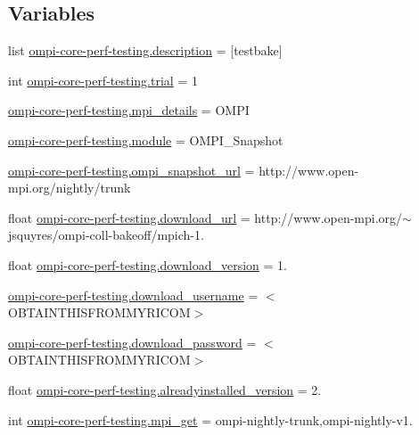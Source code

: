 \subsection*{Variables}
\begin{DoxyCompactItemize}
\item 
list \hyperlink{namespaceompi-core-perf-testing_a13c12ad10d2eefbe42582df0b6368e00}{ompi-\/core-\/perf-\/testing.\-description} = \mbox{[}testbake\mbox{]}
\item 
int \hyperlink{namespaceompi-core-perf-testing_a44334128c3f66cfb2779cf372d7021fa}{ompi-\/core-\/perf-\/testing.\-trial} = 1
\item 
\hyperlink{namespaceompi-core-perf-testing_a0afffa64305d9b33cce67b295a7b6162}{ompi-\/core-\/perf-\/testing.\-mpi\-\_\-details} = O\-M\-P\-I
\item 
\hyperlink{namespaceompi-core-perf-testing_a9cf3e97fe87ca3ae3174f504ca0003fd}{ompi-\/core-\/perf-\/testing.\-module} = O\-M\-P\-I\-\_\-\-Snapshot
\item 
\hyperlink{namespaceompi-core-perf-testing_aff15245731ec5f27b42a7377c4ea9555}{ompi-\/core-\/perf-\/testing.\-ompi\-\_\-snapshot\-\_\-url} = http\-://www.\-open-\/mpi.\-org/nightly/trunk
\item 
float \hyperlink{namespaceompi-core-perf-testing_a9a59a4bdb97826cfdd8302d83ef6fa02}{ompi-\/core-\/perf-\/testing.\-download\-\_\-url} = http\-://www.\-open-\/mpi.\-org/$\sim$jsquyres/ompi-\/coll-\/bakeoff/mpich-\/1.
\item 
float \hyperlink{namespaceompi-core-perf-testing_a74b2c9b82adde122ece307aaf00bff28}{ompi-\/core-\/perf-\/testing.\-download\-\_\-version} = 1.
\item 
\hyperlink{namespaceompi-core-perf-testing_a6e85e7b19cb6b339f8ed30ecbc658553}{ompi-\/core-\/perf-\/testing.\-download\-\_\-username} = $<$O\-B\-T\-A\-I\-N\-T\-H\-I\-S\-F\-R\-O\-M\-M\-Y\-R\-I\-C\-O\-M$>$
\item 
\hyperlink{namespaceompi-core-perf-testing_a5631c42bb25bbe102375dc4662d3b632}{ompi-\/core-\/perf-\/testing.\-download\-\_\-password} = $<$O\-B\-T\-A\-I\-N\-T\-H\-I\-S\-F\-R\-O\-M\-M\-Y\-R\-I\-C\-O\-M$>$
\item 
float \hyperlink{namespaceompi-core-perf-testing_a0741df34e0d6b86da1d5e8ef8732987d}{ompi-\/core-\/perf-\/testing.\-alreadyinstalled\-\_\-version} = 2.
\item 
int \hyperlink{namespaceompi-core-perf-testing_ad9dbd4d743b90d239ba06813eeb50181}{ompi-\/core-\/perf-\/testing.\-mpi\-\_\-get} = ompi-\/nightly-\/trunk,ompi-\/nightly-\/v1.

\end{DoxyCompactItemize}
